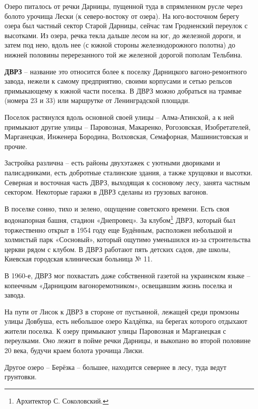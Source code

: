 Озеро питалось от речки Дарницы, пущенной туда в спрямленном русле через болото урочища Лески (к северо-востоку от озера). На юго-восточном берегу озера был частный сектор Старой Дарницы, сейчас там Гродненский переулок с высотками. Из озера, речка текла дальше лесом на юг, до железной дороги, и затем под нею, вдоль нее (с южной стороны железнодорожного полотна) до нижней половины перерезанного той же железной дорогой пополам Тельбина.\\

\medskip

\textbf{ДВРЗ} – название это относится более к поселку Дарницкого вагоно-ремонтного завода, нежели к самому предприятию, своими корпусами и сетью рельсов примыкающему к южной части поселка. В ДВРЗ можно добраться на трамвае (номера 23 и 33) или маршрутке от Ленинградской площади.

Поселок растянулся вдоль основной своей улицы – Алма-Атинской, а к ней примыкают другие улицы – Паровозная, Макаренко, Рогозовская, Изобретателей, Марганецкая, Инженера Бородина, Волховская, Семафорная, Машинистовская и прочие.

Застройка различна – есть районы двухэтажек с уютными двориками и палисадниками, есть добротные сталинские здания, а также хрущовки и высотки. Северная и восточная часть ДВРЗ, выходящая к сосновому лесу, занята частным сектором. Некоторые гаражи в ДВРЗ сделаны из грузовых вагонов.

В поселке сонно, тихо и зелено, ощущение советского времени. Есть своя водонапорная башня, стадион «Днепровец». За клубом\footnote{Архитектор С. Соколовский.} ДВРЗ, который был торжественно открыт в 1954 году еще Будённым, расположен небольшой и холмистый парк «Сосновый», который ощутимо уменьшился из-за строительства церкви рядом с клубом. В ДВРЗ работают пять детских садов, две школы, Киевская городская клиническая больница № 11.

В 1960-е, ДВРЗ мог похвастать даже собственной газетой на украинском языке – копеечным «Дарницким вагоноремотником», освещавшим жизнь поселка и завода.

На пути от Лисок к ДВРЗ в стороне от пустынной, лежащей среди промзоны улицы Довбуша, есть небольшое озеро Калдёпка, на берегах которого отдыхают жители поселка. К озеру примыкают улицы Паровозная и Марганецкая с переулками. Оно лежит в пойме речки Дарницы, и выкопано во второй половине 20 века, будучи краем болота урочища Лиски.

Другое озеро – Берёзка – большее, находится севернее в лесу, туда ведут грунтовки.

